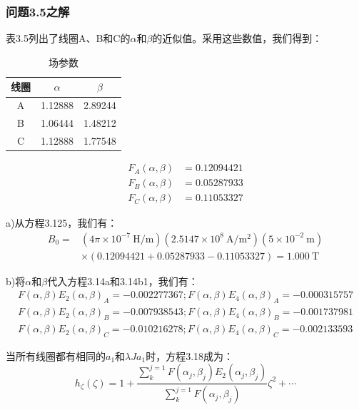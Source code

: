\subsubsection{问题3.5之解}
表3.5列出了线圈A、B和C的$\alpha$和$\beta$的近似值。采用这些数值，我们得到：

\begin{table}[htbp]\small
\centering
\caption{场参数}
	\begin{tabular}{|c|c|c|}
		\hline
		线圈 &$ \alpha$  & $\beta $  \\ \hline
		A     & 1.12888 & 2.89244 \\ \hline
		B     & 1.06444 & 1.48212 \\ \hline
		C     & 1.12888 & 1.77548 \\ \hline
	\end{tabular}
\end{table}

\begin{align*}%
F_A(\alpha,\beta)&=0.12094421\\
F_B(\alpha,\beta)&=0.05287933\\
F_C(\alpha,\beta)&=0.11053327
\end{align*}

a)从方程3.125，我们有：
\begin{equation*}%
\begin{split}
B_0=&(4\pi\times 10^{-7}\ \mathrm{H/m})(2.5147\times 10^8\ \mathrm{ A/m^2})(5\times 10^{-2}\ \mathrm{m})\\
&\times(0.12094421+0.05287933-0.11053327)=1.000\ \mathrm{T}
\end{split}
\end{equation*}

b)将$\alpha$和$\beta$代入方程3.14a和3.14b1，我们有：
 \begin{align*}%
F(\alpha,\beta)E_2(\alpha,\beta)_A=-0.002277367;F(\alpha,\beta)E_4(\alpha,\beta)_A=-0.000315757\\
F(\alpha,\beta)E_2(\alpha,\beta)_B=-0.007938543;F(\alpha,\beta)E_4(\alpha,\beta)_B=-0.001737981\\
F(\alpha,\beta)E_2(\alpha,\beta)_C=-0.010216278;F(\alpha,\beta)E_4(\alpha,\beta)_C=-0.002133593
\end{align*}

当所有线圈都有相同的$a_1$和$\lambda J a_1$时，方程3.18成为：
\begin{equation*}%
h_\zeta(\zeta)=1+\frac{\sum_{k}^{j=1}F(\alpha_j,\beta_j)E_2(\alpha_j,\beta_j)}{\sum_{k}^{j=1}F(\alpha_j,\beta_j)}\zeta^2+\cdots \tag{S5.1}
\end{equation*}

